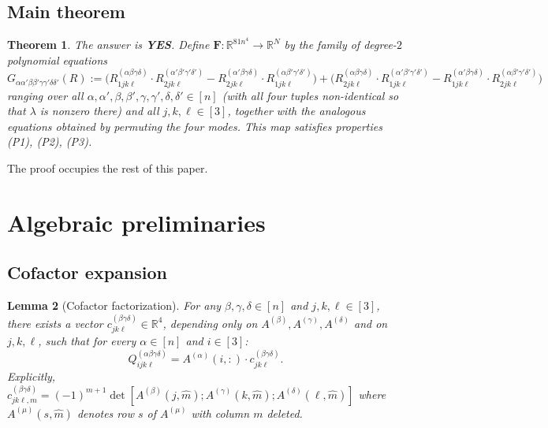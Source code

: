 \documentclass[12pt]{article}
\newtheorem{theorem}{Theorem}[section]
\newtheorem{lemma}[theorem]{Lemma}
\newcommand{\R}{\mathbb{R}}
\begin{document}
\subsection{Main theorem}

\begin{theorem}\label{thm:main}
The answer is \textbf{YES}.  Define $\mathbf{F}:\R^{81n^4}\to\R^N$ by the family of degree-$2$
polynomial equations
\begin{equation}\label{eq:Fdef}
  G_{\alpha\alpha'\beta\beta'\gamma\gamma'\delta\delta'}(R)
  :=
  \bigl(R^{(\alpha\beta\gamma\delta)}_{1jk\ell}\cdot R^{(\alpha'\beta'\gamma'\delta')}_{2jk\ell}
  - R^{(\alpha'\beta\gamma\delta)}_{2jk\ell}\cdot R^{(\alpha\beta'\gamma'\delta')}_{1jk\ell}\bigr)
  +
  \bigl(R^{(\alpha\beta\gamma\delta)}_{2jk\ell}\cdot R^{(\alpha'\beta'\gamma'\delta')}_{1jk\ell}
  - R^{(\alpha'\beta\gamma\delta)}_{1jk\ell}\cdot R^{(\alpha\beta'\gamma'\delta')}_{2jk\ell}\bigr)
\end{equation}
ranging over all $\alpha,\alpha',\beta,\beta',\gamma,\gamma',\delta,\delta'\in[n]$
(with all four tuples non-identical so that $\lambda$ is nonzero there) and all $j,k,\ell\in[3]$,
together with the analogous equations obtained by permuting the four modes.
This map satisfies properties \textup{(P1)}, \textup{(P2)}, \textup{(P3)}.
\end{theorem}

The proof occupies the rest of this paper.

\section{Algebraic preliminaries}

\subsection{Cofactor expansion}

\begin{lemma}[Cofactor factorization]\label{lem:cofactor}
For any $\beta,\gamma,\delta\in[n]$ and $j,k,\ell\in[3]$, there exists a vector
$c^{(\beta\gamma\delta)}_{jk\ell}\in\R^4$, depending only on $A^{(\beta)},A^{(\gamma)},A^{(\delta)}$
and on $j,k,\ell$, such that for every $\alpha\in[n]$ and $i\in[3]$:
\begin{equation}\label{eq:cof}
  Q^{(\alpha\beta\gamma\delta)}_{ijk\ell}
  = A^{(\alpha)}(i,:)\cdot c^{(\beta\gamma\delta)}_{jk\ell}.
\end{equation}
Explicitly, $c^{(\beta\gamma\delta)}_{jk\ell,m} = (-1)^{m+1}\det[A^{(\beta)}(j,\widehat{m});
A^{(\gamma)}(k,\widehat{m});A^{(\delta)}(\ell,\widehat{m})]$
where $A^{(\mu)}(s,\widehat{m})$ denotes row $s$ of $A^{(\mu)}$ with column $m$ deleted.
\end{lemma}
\end{document}
